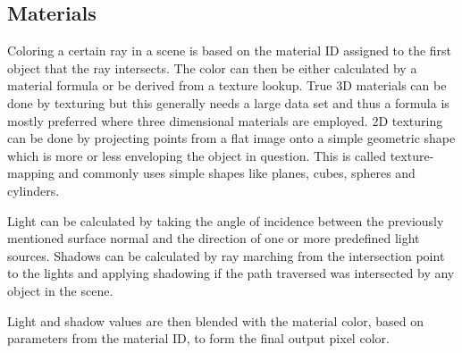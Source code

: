 			\subsection{Materials}
				Coloring a certain ray in a scene is based on the material ID
				assigned to the first object that the ray intersects. The color
				can then be either calculated by a material formula or be 
				derived from a texture lookup. True 3D materials can be done by
				texturing but this generally needs a large data set and thus a 
				formula is mostly preferred where three dimensional materials 
				are employed. 2D texturing can be done by projecting points from
				a flat image onto a simple geometric shape  which is more or less 
				enveloping the object in question. This is called texture-mapping 
				and commonly uses simple shapes like planes, cubes, spheres and 
				cylinders. 
				
				Light can be calculated by taking the angle of incidence between
				the previously mentioned surface normal and the direction of one 
				or more predefined light sources. Shadows can be calculated by 
				ray marching from the intersection point to the lights and 
				applying shadowing if the path traversed was intersected by any
				object in the scene. 
				
				Light and shadow values are then blended with the material color,
				based on parameters from the material ID, to form the final 
				output pixel color.
						
		
